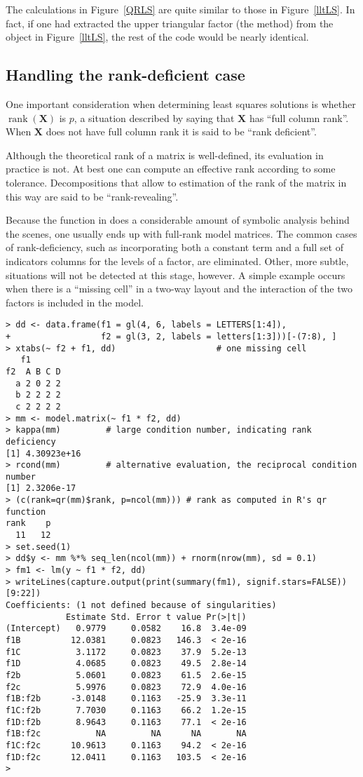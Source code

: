 \documentclass[shortnames,article]{jss}
\newcommand{\rank}{\operatorname{rank}}
\begin{document}
The calculations in Figure~\ref{QRLS} are quite similar to those in
Figure~\ref{lltLS}.  In fact, if one had extracted the upper
triangular factor (the  method) from the 
object in Figure~\ref{lltLS}, the rest of the code would be nearly
identical.


\subsection{Handling the rank-deficient case}
\label{sec:rankdeficient}

One important consideration when determining least squares solutions
is whether $\rank(\bm X)$ is $p$, a situation described by saying
that $\bm X$ has ``full column rank''.   When $\bm X$ does not have
full column rank it is said to be ``rank deficient''.

Although the theoretical rank of a matrix is well-defined, its
evaluation in practice is not.  At best one can compute an effective
rank according to some tolerance.  Decompositions that allow to
estimation of the rank of the matrix in this way are said to be
``rank-revealing''.

Because the  function in  does a
considerable amount of symbolic analysis behind the scenes, one usually
ends up with full-rank model matrices.  The common cases of
rank-deficiency, such as incorporating both a constant term and a full
set of indicators columns for the levels of a factor, are eliminated.
Other, more subtle, situations will not be detected at this stage,
however.  A simple example occurs when there is a ``missing cell'' in a
two-way layout and the interaction of the two factors is included in
the model.

\begin{verbatim}
> dd <- data.frame(f1 = gl(4, 6, labels = LETTERS[1:4]),
+                  f2 = gl(3, 2, labels = letters[1:3]))[-(7:8), ]
> xtabs(~ f2 + f1, dd)                    # one missing cell
   f1
f2  A B C D
  a 2 0 2 2
  b 2 2 2 2
  c 2 2 2 2
> mm <- model.matrix(~ f1 * f2, dd)
> kappa(mm)         # large condition number, indicating rank deficiency
[1] 4.30923e+16
> rcond(mm)         # alternative evaluation, the reciprocal condition number
[1] 2.3206e-17
> (c(rank=qr(mm)$rank, p=ncol(mm))) # rank as computed in R's qr function
rank    p 
  11   12 
> set.seed(1)
> dd$y <- mm %*% seq_len(ncol(mm)) + rnorm(nrow(mm), sd = 0.1)
> fm1 <- lm(y ~ f1 * f2, dd)
> writeLines(capture.output(print(summary(fm1), signif.stars=FALSE))[9:22])
Coefficients: (1 not defined because of singularities)
            Estimate Std. Error t value Pr(>|t|)
(Intercept)   0.9779     0.0582    16.8  3.4e-09
f1B          12.0381     0.0823   146.3  < 2e-16
f1C           3.1172     0.0823    37.9  5.2e-13
f1D           4.0685     0.0823    49.5  2.8e-14
f2b           5.0601     0.0823    61.5  2.6e-15
f2c           5.9976     0.0823    72.9  4.0e-16
f1B:f2b      -3.0148     0.1163   -25.9  3.3e-11
f1C:f2b       7.7030     0.1163    66.2  1.2e-15
f1D:f2b       8.9643     0.1163    77.1  < 2e-16
f1B:f2c           NA         NA      NA       NA
f1C:f2c      10.9613     0.1163    94.2  < 2e-16
f1D:f2c      12.0411     0.1163   103.5  < 2e-16
> 
\end{verbatim}
\end{document}
